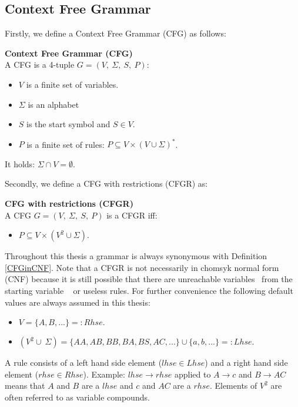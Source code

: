 \subsection{Context Free Grammar} \label{cfgChapter}
Firstly, we define a Context Free Grammar (CFG) as follows:
\begin{DefGrey} \textbf{Context Free Grammar (CFG)}\\
	A CFG is a 4-tuple $G=(V,\ \Sigma,\ S,\ P)$:
	\begin{itemize}
		\item $V$ is a finite set of variables.
		\item $\Sigma$ is an alphabet
		\item $S$ is the start symbol and $S \in V$.
		\item $P$ is a finite set of rules: $P \subseteq V \times (V \cup \Sigma)^{*}$.
	\end{itemize}
	It holds: $\Sigma \cap V =  \emptyset$.
\end{DefGrey}
\noindent Secondly, we define a CFG with restrictions (CFGR) as:
\begin{DefGrey}\label{CFGinCNF} \textbf{CFG with restrictions (CFGR)}\\
	A CFG $G=(V,\ \Sigma,\ S,\ P)$ is a CFGR iff:
	\begin{itemize}
		\item $P \subseteq V \times (V^2 \cup \Sigma)$.
	\end{itemize}
\end{DefGrey}
\noindent Throughout this thesis a grammar is always synonymous with Definition \ref{CFGinCNF}. Note that a CFGR is not necessarily in chomsyk normal form (CNF) because it is still possible that there are unreachable variables \textendash~from the starting variable \textendash~ or useless rules. For further convenience the following default values are always assumed in this thesis:
\begin{itemize}
	\item $V = \{A, B, ...\}=:Rhse.$
	\item $(V^2 \cup\ \Sigma)=\{AA, AB, BB, BA, BS, AC, ... \} \cup \{a, b, ...\}=:Lhse.$
\end{itemize}
A rule consists of a left hand side element ($lhse \in Lhse$) and a right hand side element ($rhse \in Rhse$). Example: $lhse \longrightarrow rhse$ applied to $A \longrightarrow c$ and $B \longrightarrow AC$ means that $A$ and $B$ are a $lhse$ and $c$ and $AC$ are a $rhse$. Elements of $V^2$ are often referred to as variable compounds.\\
